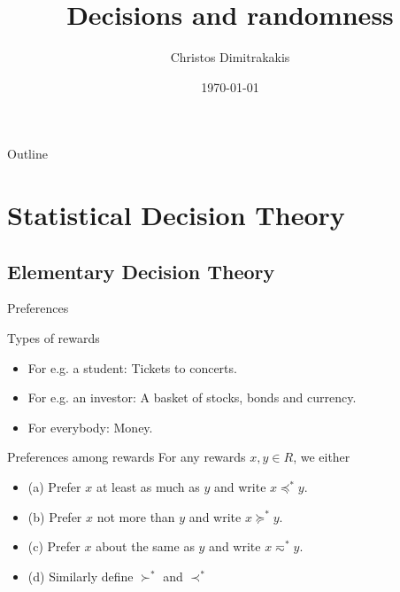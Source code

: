 \documentclass[smaller]{beamer}
\author{Christos Dimitrakakis}
\date{\today}
\title{Decisions and randomness}
\begin{document}
\maketitle
\begin{frame}{Outline}
\tableofcontents
\end{frame}


\section{Statistical Decision Theory}
\label{sec:orgbef8326}
\subsection{Elementary Decision Theory}
\label{sec:org57e7e44}
\begin{frame}[label={sec:org658a9d4}]{Preferences}
\begin{block}{Types of rewards}
\begin{itemize}
\item For e.g. a student: Tickets to concerts.
\item For e.g. an investor: A basket of stocks, bonds and currency.
\item For everybody: Money.
\end{itemize}
\end{block}

\begin{block}{Preferences among rewards}
For any rewards \(x, y \in R\), we either
\begin{itemize}
\item (a) Prefer \(x\) at least as much as \(y\) and write \(x \preceq^* y\).
\item (b) Prefer \(x\) not more than \(y\) and write \(x \succeq^* y\).
\item (c) Prefer \(x\) about the same as \(y\) and write \(x \eqsim^* y\).
\item (d) Similarly define \(\succ^*\) and \(\prec^*\)
\end{itemize}
\end{block}
\end{frame}
\end{document}
